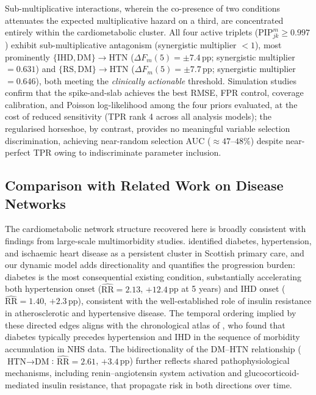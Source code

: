 \documentclass[12pt]{article}
\begin{document}
Sub-multiplicative interactions, wherein the co-presence of two conditions 
attenuates the expected multiplicative hazard on a third, are concentrated 
entirely within the cardiometabolic cluster. All four active triplets 
($\text{PIP}_{jk}^{m} \geq 0.997$) exhibit sub-multiplicative antagonism 
(synergistic multiplier $< 1$), most prominently 
$\{\text{IHD}, \text{DM}\} \to \text{HTN}$ ($\Delta F_m(5) = \pm7.4$\,pp; 
synergistic multiplier $= 0.631$) and 
$\{\text{RS}, \text{DM}\} \to \text{HTN}$ ($\Delta F_m(5) = \pm7.7$\,pp; 
synergistic multiplier $= 0.646$), both meeting the \emph{clinically actionable} 
threshold. Simulation studies confirm that the spike-and-slab achieves the best 
RMSE, FPR control, coverage calibration, and Poisson log-likelihood among the 
four priors evaluated, at the cost of reduced sensitivity (TPR rank 4 across 
all analysis models); the regularised horseshoe, by contrast, provides no meaningful 
variable selection discrimination, achieving near-random selection AUC 
($\approx 47\text{--}48\%$) despite near-perfect TPR owing to indiscriminate 
parameter inclusion.

\subsection{Comparison with Related Work on Disease Networks}

The cardiometabolic network structure recovered here is broadly consistent with 
findings from large-scale multimorbidity studies. \citet{barnett2012epidemiology} 
identified diabetes, hypertension, and ischaemic heart disease as a persistent 
cluster in Scottish primary care, and our dynamic model adds directionality and 
quantifies the progression burden: diabetes is the most consequential existing 
condition, substantially accelerating both hypertension onset 
($\widehat{\text{RR}} = 2.13$, $+12.4$\,pp at 5 years) and IHD onset 
($\widehat{\text{RR}} = 1.40$, $+2.3$\,pp), consistent with the well-established 
role of insulin resistance in atherosclerotic and hypertensive disease. The 
temporal ordering implied by these directed edges aligns with the chronological 
atlas of \citet{kuan2019chronological}, who found that diabetes typically 
precedes hypertension and IHD in the sequence of morbidity accumulation in NHS 
data. The bidirectionality of the DM--HTN relationship 
($\text{HTN} \to \text{DM}$: $\widehat{\text{RR}} = 2.61$, $+3.4$\,pp) further 
reflects shared pathophysiological mechanisms, including renin--angiotensin 
system activation and glucocorticoid-mediated insulin resistance, that propagate 
risk in both directions over time.
\end{document}
